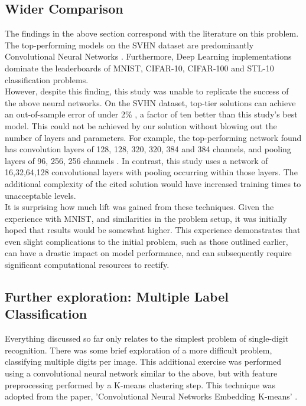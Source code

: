 \documentclass[12pt]{article}
\begin{document}
\subsection{Wider Comparison}

The findings in the above section correspond with the literature on this problem. The top-performing models on the SVHN dataset are predominantly Convolutional Neural Networks \citep{problemperformance}. Furthermore, Deep Learning implementations dominate the leaderboards of MNIST, CIFAR-10, CIFAR-100 and STL-10 classification problems.\\

However, despite this finding, this study was unable to replicate the success of the above neural networks. On the SVHN dataset, top-tier solutions can achieve an out-of-sample error of under 2\% \citep{problemperformance}, a factor of ten better than this study's best model. This could not be achieved by our solution without blowing out the number of layers and parameters. For example, the top-performing network found has convolution layers of 128, 128, 320, 320, 384 and 384 channels, and pooling layers of 96, 256, 256 channels \citep{bestsvhn}. In contrast, this study uses a network of 16,32,64,128 convolutional layers with pooling occurring within those layers. The additional complexity of the cited solution would have increased training times to unacceptable levels.\\

It is surprising how much lift was gained from these techniques. Given the experience with MNIST, and similarities in the problem setup, it was initially hoped that results would be somewhat higher. This experience demonstrates that even slight complications to the initial problem, such as those outlined earlier, can have a drastic impact on model performance, and can subsequently require significant computational resources to rectify.\\

\subsection{Further exploration: Multiple Label Classification}

Everything discussed so far only relates to the simplest problem of single-digit recognition. There was some brief exploration of a more difficult problem, classifying multiple digits per image. This additional exercise was performed using a convolutional neural network similar to the above, but with feature preprocessing performed by a K-means clustering step. This technique was adopted from the paper, 'Convolutional Neural Networks Embedding K-means' \citep{kmeanscnn}.\\
\end{document}
